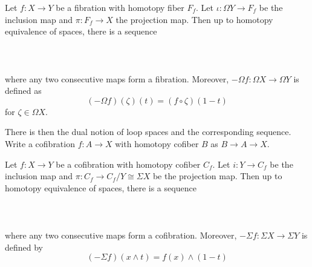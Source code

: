 \documentclass[a4paper]{article}
\begin{document}
\begin{thm}{}{} Let $f:X\to Y$ be a fibration with homotopy fiber $F_f$. Let $\iota:\Omega Y\to F_f$ be the inclusion map and $\pi:F_f\to X$ the projection map. Then up to homotopy equivalence of spaces, there is a sequence \\~\\
\\~\\
where any two consecutive maps form a fibration. Moreover, $-\Omega f:\Omega X\to\Omega Y$ is defined as $$(-\Omega f)(\zeta)(t)=(f\circ\zeta)(1-t)$$ for $\zeta\in\Omega X$. 
\end{thm}

There is then the dual notion of loop spaces and the corresponding sequence. Write a cofibration $f:A\to X$ with homotopy cofiber $B$ as $B\to A\to X$. 

\begin{thm}{}{} Let $f:X\to Y$ be a cofibration with homotopy cofiber $C_f$. Let $i:Y\to C_f$ be the inclusion map and $\pi:C_f\to C_f/Y\cong\Sigma X$ be the projection map. Then up to homotopy equivalence of spaces, there is a sequence \\~\\
\\~\\
where any two consecutive maps form a cofibration. Moreover, $-\Sigma f:\Sigma X\to\Sigma Y$ is defined by $$(-\Sigma f)(x\wedge t)=f(x)\wedge(1-t)$$
\end{thm}
\end{document}
